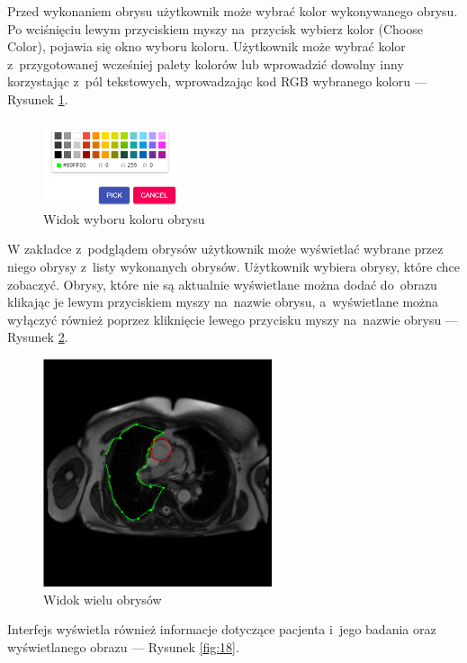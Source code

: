 \documentclass[a4paper,11pt,twoside,openright]{report}
\theoremstyle{definition}
\begin{document}
\begin{enumerate}
\pagebreak
Przed wykonaniem obrysu użytkownik może wybrać kolor wykonywanego obrysu.
Po wciśnięciu lewym przyciskiem myszy na~przycisk wybierz kolor (Choose Color),
pojawia się okno wyboru koloru. Użytkownik może wybrać kolor z~przygotowanej
wcześniej palety kolorów lub wprowadzić dowolny inny korzystając z~pól tekstowych,
wprowadzając kod RGB wybranego koloru --- Rysunek \ref{fig:16}.

\begin{figure}[h!]
	\center
	\includegraphics[width=0.35\textwidth]{16}
	\caption{Widok wyboru koloru obrysu}
    	\label{fig:16}
\end{figure}

W zakładce z~podglądem obrysów użytkownik może wyświetlać wybrane przez niego
obrysy z~listy wykonanych obrysów. Użytkownik wybiera obrysy, które chce zobaczyć.
Obrysy, które nie są aktualnie wyświetlane można dodać do~obrazu klikając je
lewym przyciskiem myszy na~nazwie obrysu, a~wyświetlane można wyłączyć również
poprzez kliknięcie lewego przycisku myszy na~nazwie obrysu --- Rysunek \ref{fig:17}.

\begin{figure}[h!]
	\center
	\includegraphics[width=0.6\textwidth]{17}
	\caption{Widok wielu obrysów}
    	\label{fig:17}
\end{figure}

\pagebreak

Interfejs wyświetla również informacje dotyczące pacjenta i~jego badania oraz
wyświetlanego obrazu --- Rysunek \ref{fig:18}.


\end{enumerate}
\end{document}
